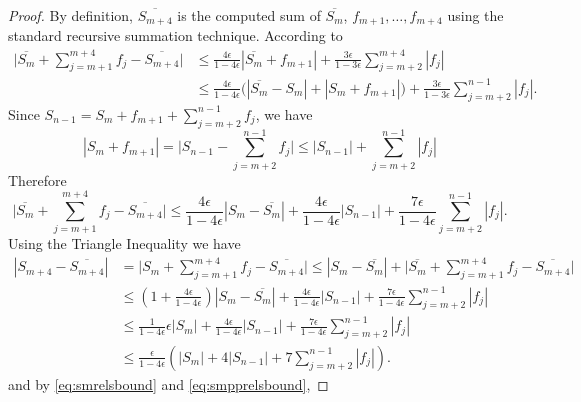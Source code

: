 \documentclass[12pt]{article}
\theoremstyle{definition}
\numberwithin{equation}{section}
\numberwithin{figure}{section}
\begin{document}
\begin{proof}
      By definition, $\overline{S_{m+4}}$ is the computed sum of
      $\overline{S_m}$, $f_{m+1}, \ldots, f_{m+4}$ using the standard recursive summation technique.
      According to \cite[Equation 1.2, 2.4]{higham}
      \begin{align*}
          \bigl|\overline{S_m} + \sum_{j=m+1}^{m+4}f_j - \overline{S_{m+4}}\bigr|
          & \leq \frac{4\epsilon}{1-4\epsilon} \left|\overline{S_m} + f_{m+1}\right| + \frac{3\epsilon}{1-3\epsilon} \sum_{j=m+2}^{m+4}|f_j| \\
          & \leq \frac{4\epsilon}{1-4\epsilon} \bigl(\left|\overline{S_m} - S_m\right| + |S_m + f_{m+1}|\bigr)
              + \frac{3\epsilon}{1-3\epsilon} \sum_{j=m+2}^{n-1}|f_j|.
      \end{align*}
      Since $S_{n-1} = S_m + f_{m+1} + \sum_{j=m+2}^{n-1} f_j$, we have
      \begin{equation*}
          |S_m + f_{m+1}|
          = \bigl|S_{n-1} - \sum_{j=m+2}^{n-1}f_j\bigr|
          \leq |S_{n-1}| + \sum_{j=m+2}^{n-1} |f_j|
      \end{equation*}
      Therefore
      \begin{equation*}
          \bigl|\overline{S_m} + \sum_{j=m+1}^{m+4}f_j - \overline{S_{m+4}}\bigr|
          \leq \frac{4\epsilon}{1-4\epsilon} \left|S_m - \overline{S_m}\right|
          + \frac{4\epsilon}{1-4\epsilon} |S_{n-1}|
          + \frac{7\epsilon}{1-4\epsilon} \sum_{j=m+2}^{n-1}|f_j|.
      \end{equation*}
      Using the Triangle Inequality we have
      \begin{align*}
      \left|S_{m+4} - \overline{S_{m+4}}\right|
          & = \bigl|S_m + \sum_{j=m+1}^{m+4}f_j - \overline{S_{m+4}}\bigr|
          \leq \left|S_m - \overline{S_m} \right| + \bigl|\overline{S_m} + \sum_{j=m+1}^{m+4}f_j - \overline{S_{m+4}} \bigr| \\
          & \leq \left(1 + \frac{4\epsilon}{1-4\epsilon}\right) \left|S_m - \overline{S_m}\right| + \frac{4\epsilon}{1-4\epsilon} |S_{n-1}|
                  + \frac{7\epsilon}{1-4\epsilon} \sum_{j=m+2}^{n-1}|f_j| \\
          & \leq \frac{1}{1-4\epsilon} \epsilon |S_m| + \frac{4\epsilon}{1-4\epsilon} |S_{n-1}|
                  + \frac{7\epsilon}{1-4\epsilon} \sum_{j=m+2}^{n-1}|f_j| \\
          & \leq \frac{\epsilon}{1-4\epsilon} \left(|S_m| + 4 |S_{n-1}|
                  + 7 \sum_{j=m+2}^{n-1}|f_j|\right).
      \end{align*}
      and by \eqref{eq:smrelsbound} and \eqref{eq:smpprelsbound},

\end{proof}
\end{document}
